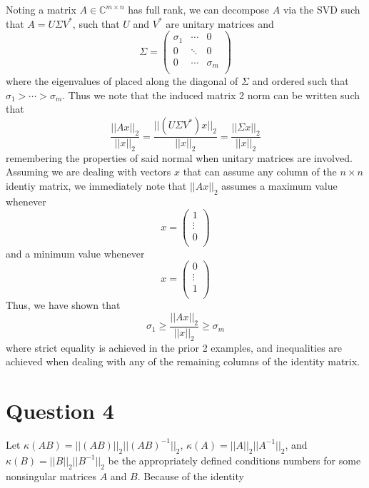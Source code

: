 \documentclass[a4paper,12pt]{article}
\begin{document}
Noting a matrix $A \in \mathbb{C}^{m\times n}$ has full rank, we can decompose $A$ via the SVD such that $A=U\Sigma V^*$, such that $U$ and $V^*$ are unitary matrices and 
\begin{equation}
\Sigma = \begin{pmatrix}
\sigma_1 &  \cdots & 0 \\
0 & \ddots &0 \\
0& \cdots & \sigma_m \\
\end{pmatrix}
\end{equation} where the eigenvalues of placed along the diagonal of $\Sigma$ and ordered such that $\sigma_1 > \cdots > \sigma_m$. Thus we note that the induced matrix 2 norm can be written such that
\begin{equation}
\frac{|| Ax||_2}{||x||_2}= \frac{||(U\Sigma V^*)x ||_2}{||x||_2} = \frac{||\Sigma x||_2}{||x||_2}
\end{equation} remembering the properties of said normal when unitary matrices are involved. Assuming we are dealing with vectors $x$ that can assume any column of the $n\times n$ identiy matrix, we immediately note that $||Ax||_2$ assumes a maximum value whenever
\begin{equation}
x= \begin{pmatrix}
1\\
\vdots \\
0 \\
\end{pmatrix}
\end{equation}
and a minimum value whenever
\begin{equation}
x= \begin{pmatrix}
0\\
\vdots \\
1 \\
\end{pmatrix}
\end{equation}
Thus, we have shown that
\begin{equation}
\sigma_1 \ge \frac{|| Ax||_2}{||x||_2} \ge \sigma_m
\end{equation}
where strict equality is achieved in the prior 2 examples, and inequalities are achieved when dealing with any of the remaining columns of the identity matrix. 
  
  
  
 \section{Question 4}
 Let $\kappa(AB) = ||(AB)||_2 || (AB)^{-1} ||_2$, $\kappa(A) = ||A||_2 ||A^{-1}||_2$, and $\kappa(B)=||B||_2 ||B^{-1}||_2$ be the appropriately defined conditions numbers for some nonsingular matrices $A$ and $B$. Because of the identity 
 
\end{document}
